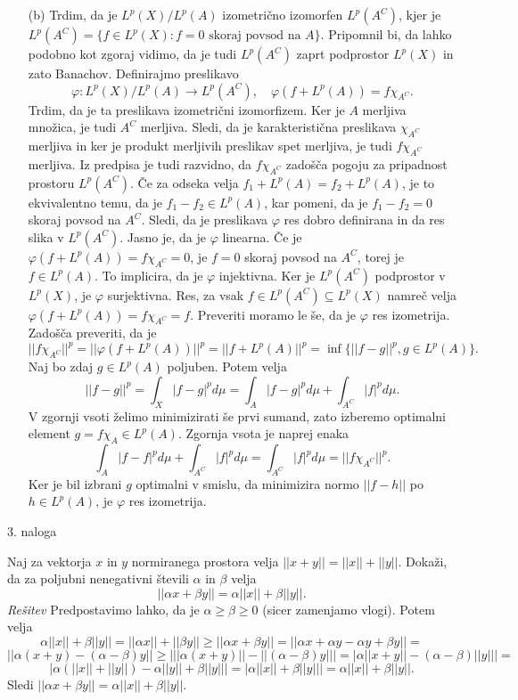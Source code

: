 \documentclass[a4paper, 12pt]{article}
\begin{document}
\begin{enumerate}
\item[(b)] Trdim, da je $L^p(X) / L^p(A)$ izometrično izomorfen $L^p(A^C)$, kjer je $L^p(A^C)=\{f\in L^p(X): f=0\textrm{ skoraj povsod na } A\}$. Pripomnil bi, da lahko podobno kot zgoraj vidimo, da je tudi $L^p(A^C)$ zaprt podprostor $L^p(X)$ in zato Banachov.
Definirajmo preslikavo
$$
\varphi:L^p(X) /L^p(A) \rightarrow L^p(A^C), \quad \varphi(f+L^p(A)) = f\chi_{A^C}.
$$ 
Trdim, da je ta preslikava izometrični izomorfizem. Ker je $A$ merljiva množica, je tudi $A^C$ merljiva. Sledi, da je karakteristična preslikava $\chi_{A^C}$ merljiva in ker je produkt merljivih preslikav spet merljiva, je tudi $f\chi_{A^C}$ merljiva. Iz predpisa je tudi razvidno, da $f\chi_{A^C}$ zadošča pogoju za pripadnost prostoru $L^p(A^C)$. Če za odseka velja $f_1 + L^p(A) = f_2 + L^p(A)$, je to ekvivalentno temu, da je $f_1 - f_2 \in L^p(A)$, kar pomeni, da je $f_1 - f_2 = 0$ skoraj povsod na $A^C$. Sledi, da je preslikava $\varphi$ res dobro definirana in da res slika v $L^p(A^C)$. Jasno je, da je $\varphi$ linearna. Če je $\varphi(f+L^p(A)) = f\chi_{A^C} = 0$, je $f=0$ skoraj povsod na $A^C$, torej je $f\in L^p(A)$. To implicira, da je $\varphi$ injektivna. Ker je $L^p(A^C)$ podprostor v $L^p(X)$, je $\varphi$ surjektivna. Res, za vsak $f\in L^p(A^C) \subseteq L^p(X)$ namreč velja $\varphi (f +L^p(A)) = f\chi_{A^C} = f$.
Preveriti moramo le še, da je $\varphi$ res izometrija. Zadošča preveriti, da je 
$$
||f\chi_{A^C}||^p = ||\varphi(f+L^p(A))||^p = ||f+L^p(A)||^p = \inf\{||f-g||^p, g\in L^p(A)\}.
$$
Naj bo zdaj $g\in L^p(A)$ poljuben. Potem velja
$$
||f-g||^p = \int_X |f-g|^p d\mu = \int_A|f-g|^p d\mu + \int_{A^C} |f|^p d\mu.
$$
V zgornji vsoti želimo minimizirati še prvi sumand, zato izberemo optimalni element $g=f\chi_A\in L^p(A)$. Zgornja vsota je  naprej enaka
$$
\int_A|f-f|^p d\mu + \int_{A^C} |f|^pd\mu = \int_{A^C}|f|^pd\mu = ||f\chi_{A^C}||^p.
$$
Ker je bil izbrani $g$ optimalni v smislu, da minimizira normo $||f-h||$ po $h\in L^p(A)$, je $\varphi$ res izometrija.
\end{enumerate}

\begin{flushleft}
3. naloga
\end{flushleft}
Naj za vektorja $x$ in $y$ normiranega prostora velja $|| x+y|| = ||x|| + ||y||$. Dokaži, da za poljubni nenegativni števili $\alpha$ in $\beta$ velja
$$
||\alpha x + \beta y|| = \alpha ||x|| + \beta ||y||.
$$
\emph{Rešitev}
\newline
Predpostavimo lahko, da je $\alpha \ge \beta \ge 0$ (sicer zamenjamo vlogi). Potem velja 
$$
\alpha ||x|| + \beta ||y|| = ||\alpha x|| + ||\beta y|| \ge ||\alpha x + \beta y ||= ||\alpha x + \alpha y - \alpha y + \beta y||=
$$
$$
||\alpha (x+y) - (\alpha - \beta)y|| \ge \Big| ||\alpha(x+y) || - ||(\alpha - \beta)y|| \Big| = \Big| \alpha||x+y|| - (\alpha - \beta) ||y|| \Big|=
$$
$$
\Big| \alpha (||x|| + ||y||) - \alpha ||y|| + \beta ||y||\Big| = \Big| \alpha ||x|| + \beta ||y||\Big| = \alpha ||x|| + \beta ||y||.
$$
Sledi $||\alpha x + \beta y || = \alpha ||x|| + \beta ||y||$.
\end{document}
